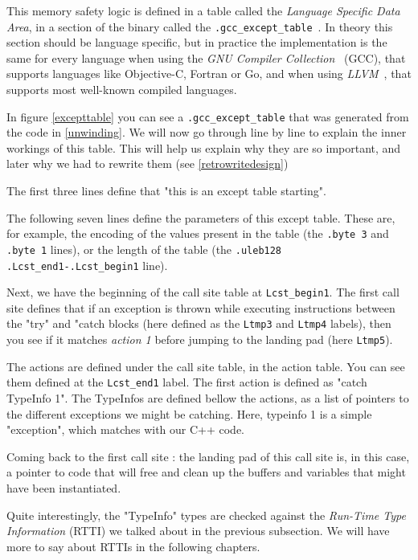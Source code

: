 \documentclass[a4paper,11pt,oneside]{report}
\begin{document}
This memory safety logic is defined in a table called the \emph{Language
Specific Data Area}, in a section of the binary called the
\texttt{.gcc\_except\_table}~\cite{airsexcepttable}.
In theory this section should be language specific, but in practice the
implementation is the same for every language when using the \emph{GNU
Compiler Collection}~\cite{gcc} (GCC), that supports languages like
Objective-C, Fortran or Go, and when using \emph{LLVM}~\cite{llvm}, that
supports most well-known compiled languages.

In figure \autoref{excepttable} you can see a \texttt{.gcc\_except\_table} that 
was generated from the code in \autoref{unwinding}. We will now go through line
by line to explain the inner workings of this table.
This will help us explain why they are so important, and later why we had to
rewrite them (see \autoref{retrowritedesign})

The first three lines define that "this is an except table starting".

The following seven lines define the parameters of this except table.
These are, for example, the encoding of the values present in the table (the
\texttt{.byte 3} and \texttt{.byte 1} lines), or the length of the table (the
\texttt{.uleb128 .Lcst\_end1-.Lcst\_begin1} line).

Next, we have the beginning of the call site table at \texttt{Lcst\_begin1}.
The first call site defines that if an exception is thrown while executing
instructions between the "try" and "catch blocks (here defined as the
\texttt{Ltmp3} and \texttt{Ltmp4} labels), then you see if it matches
\emph{action 1} before jumping to the landing pad (here \texttt{Ltmp5}).

The actions are defined under the call site table, in the action table. You
can see them defined at the \texttt{Lcst\_end1} label.
The first action is defined as "catch TypeInfo 1". The TypeInfos are defined
bellow the actions, as a list of pointers to the different exceptions we might
be catching. Here, typeinfo 1 is a simple "exception", which matches with our
C++ code.

Coming back to the first call site : the landing pad of this call site is, in
this case, a pointer to code that will free and clean up the buffers and
variables that might have been instantiated.

Quite interestingly, the "TypeInfo" types are checked against the
\emph{Run-Time Type Information} (RTTI) we talked about in the previous
subsection.
We will have more to say about RTTIs in the following chapters.
\end{document}
